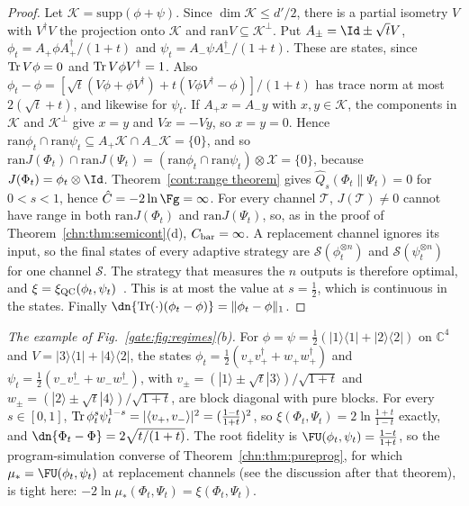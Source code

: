 \begin{proof}
Let $\mathcal K=\mathrm{supp}(\phi+\psi)$. Since $\dim\mathcal K\le d'/2$, there is a partial isometry $V$ with $V^\dagger V$ the projection onto $\mathcal K$ and $\mathrm{ran}V\subseteq\mathcal K^\perp$. Put $A_\pm=\Id\pm\sqrt tV$, $\phi_t=A_+\phi A_+^\dagger/(1+t)$ and $\psi_t=A_-\psi A_-^\dagger/(1+t)$. These are states, since $\operatorname{Tr} V\phi=0$ and $\operatorname{Tr} V\phi V^\dagger=1$. Also $\phi_t-\phi=[\sqrt t(V\phi+\phi V^\dagger)+t(V\phi V^\dagger-\phi)]/(1+t)$ has trace norm at most $2(\sqrt t+t)$, and likewise for $\psi_t$. If $A_+x=A_-y$ with $x,y\in\mathcal K$, the components in $\mathcal K$ and $\mathcal K^\perp$ give $x=y$ and $Vx=-Vy$, so $x=y=0$. Hence $\mathrm{ran}\phi_t\cap\mathrm{ran}\psi_t\subseteq A_+\mathcal K\cap A_-\mathcal K=\{0\}$, and so $\mathrm{ran}J(\Phi_t)\cap\mathrm{ran}J(\Psi_t)=(\mathrm{ran}\phi_t\cap\mathrm{ran}\psi_t)\otimes\mathcal X=\{0\}$, because $J(\Phi_t)=\phi_t\otimes\Id$. Theorem~\ref{cont:range theorem} gives $\hat Q_s(\Phi_t\|\Psi_t)=0$ for $0<s<1$, hence $\hat C=-2\ln\Fg=\infty$. For every channel $\mathcal T$, $J(\mathcal T)\ne0$ cannot have range in both $\mathrm{ran}J(\Phi_t)$ and $\mathrm{ran}J(\Psi_t)$, so, as in the proof of Theorem~\ref{chn:thm:semicont}(d), $C_{\rm bar}=\infty$. A replacement channel ignores its input, so the final states of every adaptive strategy are $\mathcal S(\phi_t^{\otimes n})$ and $\mathcal S(\psi_t^{\otimes n})$ for one channel $\mathcal S$. The strategy that measures the $n$ outputs is therefore optimal, and $\xi=\xi_{\rm QC}(\phi_t,\psi_t)$~\cite{AudenaertChernoff2007,NussbaumSzkola2009}. This is at most the value at $s=\frac12$, which is continuous in the states. Finally $\dn{\Tr(\cdot)(\phi_t-\phi)}=\|\phi_t-\phi\|_1$.
\end{proof}

\emph{The example of Fig.~\ref{gate:fig:regimes}(b).} For $\phi=\psi=\frac12(|1\rangle\langle1|+|2\rangle\langle2|)$ on $\mathbb C^4$ and $V=|3\rangle\langle1|+|4\rangle\langle2|$, the states $\phi_t=\frac12(v_+v_+^\dagger+w_+w_+^\dagger)$ and $\psi_t=\frac12(v_-v_-^\dagger+w_-w_-^\dagger)$, with $v_\pm=(|1\rangle\pm\sqrt t|3\rangle)/\sqrt{1+t}$ and $w_\pm=(|2\rangle\pm\sqrt t|4\rangle)/\sqrt{1+t}$, are block diagonal with pure blocks. For every $s\in[0,1]$, $\operatorname{Tr}\phi_t^s\psi_t^{1-s}=|\langle v_+,v_-\rangle|^2=(\frac{1-t}{1+t})^2$, so $\xi(\Phi_t,\Psi_t)=2\ln\frac{1+t}{1-t}$ exactly, and $\dn{\Phi_t-\Phi}=2\sqrt{t/(1+t)}$. The root fidelity is $\FU(\phi_t,\psi_t)=\frac{1-t}{1+t}$, so the program-simulation converse of Theorem~\ref{chn:thm:pureprog}, for which $\mu_*=\FU(\phi_t,\psi_t)$ at replacement channels (see the discussion after that theorem), is tight here: $-2\ln\mu_*(\Phi_t,\Psi_t)=\xi(\Phi_t,\Psi_t)$.

